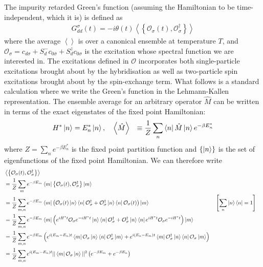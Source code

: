 \documentclass[prb]{revtex4-2}
\begin{document}
\label{appx-spectral-func}
The impurity retarded Green's function (assuming the Hamiltonian to be time-independent, which it is) is defined as
\begin{equation}\begin{aligned}
	G_{dd}^\sigma(t) = -i\theta(t) \left<\left\{ \mathcal{O}_{\sigma}(t),\mathcal{O}^\dagger_{\sigma} \right\}  \right>
\end{aligned}\end{equation}
where the average \(\left< \right>\) is over a canonical ensemble at temperature \(T\), and \(\mathcal{O}_\sigma = c_{d\sigma} + S_d^- c_{0\overline\sigma} + S_d^z c_{0\sigma}\) is the excitation whose spectral function we are interested in. The excitations defined in \(\mathcal{O}\) incorporates both single-particle excitations brought about by the hybridisation as well as two-particle spin excitations brought about by the spin-exchange term. What follows is a standard calculation where we write the Green's function in the Lehmann-Kallen representation. The ensemble average for an arbitrary operator \(\hat M\) can be written in terms of the exact eigenstates of the fixed point Hamiltonian:
\begin{equation}\begin{aligned}
	H^* \ket{n} &= E_n^* \ket{n}, ~ ~ ~\left<\hat M \right> &\equiv \frac{1}{Z}\sum_n \bra{n} \hat M \ket{n} e^{-\beta E_n^*}
\end{aligned}\end{equation}
where \(Z = \sum_n e^{-\beta E_n^*}\) is the fixed point partition function and \(\left\{ \ket{n} \right\} \) is the set of eigenfunctions of the fixed point Hamiltonian. We can therefore write
\begin{equation}\begin{aligned}
	&\left<\left\{ \mathcal{O}_{\sigma}(t),\mathcal{O}^\dagger_{\sigma} \right\}  \right> \\
	&= \frac{1}{Z}\sum_{m}e^{-\beta E_m}\bra{m}\left\{ \mathcal{O}_{\sigma}(t),\mathcal{O}^\dagger_{\sigma} \right\} \ket{m}\\
	&= \frac{1}{Z}\sum_{m,n}e^{-\beta E_m}\bra{m}\left( \mathcal{O}_{\sigma}(t)\ket{n}\bra{n}\mathcal{O}^\dagger_{\sigma} + \mathcal{O}^\dagger_{\sigma}\ket{n}\bra{n}\mathcal{O}_{\sigma}(t)\right) \ket{m} && \left[\sum_n \ket{n}\bra{n} = 1\right]  \\
	&= \frac{1}{Z}\sum_{m,n}e^{-\beta E_m}\bra{m}\left( e^{iH^* t}\mathcal{O}_{\sigma}e^{-iH^* t}\ket{n}\bra{n}\mathcal{O}^\dagger_{\sigma} + \mathcal{O}^\dagger_{\sigma}\ket{n}\bra{n}e^{iH^* t}\mathcal{O}_{\sigma}e^{-iH^* t}\right) \ket{m}\\
	&= \frac{1}{Z}\sum_{m,n}e^{-\beta E_m}\left( e^{i\left( E_m - E_n \right)  t}\bra{m}\mathcal{O}_{\sigma}\ket{n}\bra{n}\mathcal{O}^\dagger_{\sigma} \ket{m} + e^{i\left( E_n - E_m \right)  t}\bra{m}\mathcal{O}^\dagger_{\sigma}\ket{n}\bra{n}\mathcal{O}_{\sigma} \ket{m}\right)\\
	&= \frac{1}{Z}\sum_{m,n}e^{i\left( E_m - E_n \right)  t}||\bra{m}\mathcal{O}_{\sigma}\ket{n}||^2\left( e^{-\beta E_m} + e^{-\beta E_n}\right)\\
\end{aligned}\end{equation}
\end{document}
